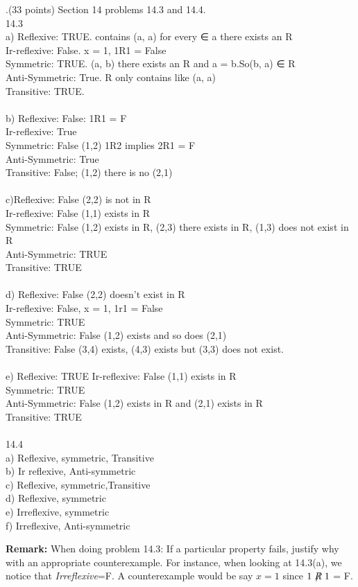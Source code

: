 \documentclass[12pt]{article}
\begin{document}
.(33 points) Section 14 problems 14.3 and 14.4. \\

14.3 \\ 
\indent a) Reflexive: TRUE. contains (a, a) for every ∈ a there exists an R\\
\indent Ir-reflexive: False. x = 1, 1R1 = False\\
\indent Symmetric: TRUE. (a, b) there exists an  R and a = b.So(b, a) ∈ R \\
\indent Anti-Symmetric: True. R only contains like (a, a) \\
\indent Transitive: TRUE. \\
\\
\indent b) Reflexive: False: 1R1 = F \\
\indent Ir-reflexive: True\\
\indent Symmetric: False (1,2) 1R2 implies 2R1 = F \\ 
\indent Anti-Symmetric: True \\
\indent Transitive: False; (1,2) there is no (2,1) \\
\\
\indent c)Reflexive: False (2,2)  is not in R \\ 
\indent Ir-reflexive: False (1,1) exists in R \\
\indent Symmetric: False (1,2) exists in R, (2,3) there exists in R, (1,3) does not exist in R \\ 
\indent Anti-Symmetric: TRUE  \\ 
\indent Transitive: TRUE \\ 
\\ 
\indent d) Reflexive: False (2,2) doesn't exist in R\\
\indent Ir-reflexive:  False, x = 1, 1r1 = False \\
\indent Symmetric: TRUE\\
\indent Anti-Symmetric: False (1,2) exists and so does (2,1) \\
\indent Transitive: False (3,4) exists, (4,3) exists but (3,3) does not exist. \\
\\
\indent e) Reflexive: TRUE
\indent Ir-reflexive: False (1,1) exists in R\\
\indent Symmetric: TRUE \\
\indent Anti-Symmetric: False (1,2) exists in R and (2,1) exists in R\\
\indent Transitive: TRUE\\
\\
14.4\\
\indent a) Reflexive, symmetric, Transitive \\
\indent b) Ir reflexive, Anti-symmetric \\
\indent c) Reflexive, symmetric,Transitive \\
\indent d) Reflexive, symmetric \\
\indent e) Irreflexive, symmetric \\
\indent f) Irreflexive, Anti-symmetric \\

\vspace{.15in}

\noindent \textbf{Remark:} When doing problem 14.3:  If a particular property fails, justify why with an appropriate counterexample.  For instance, when looking at 14.3(a), we notice that \textit{Irreflexive}=F.  A counterexample would be say $x = 1$ since $1 \centernot{R} 1$ = F.  
\end{document}
